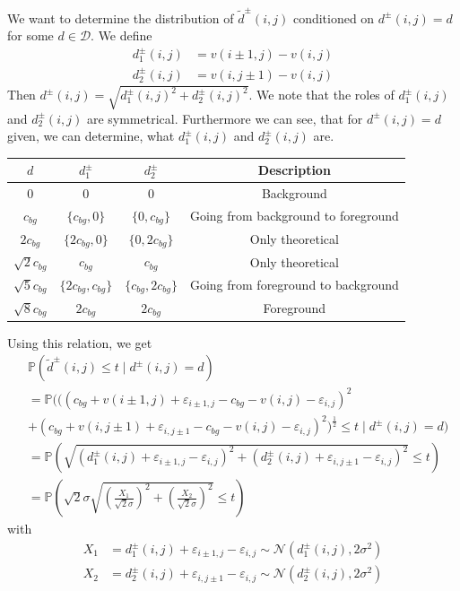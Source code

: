 \documentclass[a4paper,12pt]{article}
\theoremstyle{plain}
\theoremstyle{definition}
\theoremstyle{remark}
\begin{document}
	We want to determine the distribution of $\tilde{d}^\pm(i, j)$ conditioned on $d^\pm(i, j) = d$ for some $d \in \mathcal{D}$. We define
	\begin{align*}
		d_1^\pm(i, j) &= v(i \pm 1, j) - v(i, j) \\
		d_2^\pm(i, j) &= v(i, j \pm 1) - v(i, j)
	\end{align*}
	Then $d^\pm(i, j) = \sqrt{d_1^\pm(i, j)^2 + d_2^\pm(i, j)^2}$. We note that the roles of $d_1^\pm(i, j)$ and $d_2^\pm(i, j)$ are symmetrical. Furthermore we can see, that for $d^\pm(i, j) = d$ given, we can determine, what $d_1^\pm(i, j)$ and $d_2^\pm(i, j)$ are.
	
	\begin{center}
		\begin{tabular}{c|c|c|c}
			$d$ & $d_1^\pm$ & $d_2^\pm$ & Description \\
			\hline
			$0$ & $0$ & $0$ & Background \\
			\hline
			$c_{bg}$ & $\{ c_{bg}, 0 \}$ & $\{ 0, c_{bg} \}$ & Going from background to foreground \\
			\hline
			$2 c_{bg}$ & $\{ 2 c_{bg}, 0 \}$ & $\{ 0, 2 c_{bg} \}$ & Only theoretical \\
			\hline
			$\sqrt{2} c_{bg}$ & $c_{bg}$ & $c_{bg}$ & Only theoretical \\
			\hline
			$\sqrt{5} c_{bg}$ & $\{ 2 c_{bg}, c_{bg} \}$ & $\{ c_{bg}, 2 c_{bg} \}$ & Going from foreground to background \\
			\hline
			$\sqrt{8} c_{bg}$ & $2 c_{bg}$ & $2 c_{bg}$ & Foreground \\
		\end{tabular}
	\end{center}
	
	Using this relation, we get
	\begin{align*}
		&\mathbb{P}(\tilde{d}^\pm(i, j) \leq t \mid d^\pm(i, j) = d) \\
		&= \mathbb{P}(( (c_{bg} + v(i \pm 1, j) + \varepsilon_{i \pm 1, j} - c_{bg} - v(i, j) - \varepsilon_{i, j})^2 \\
		&+ (c_{bg} + v(i, j \pm 1) + \varepsilon_{i, j \pm 1} - c_{bg} - v(i, j) - \varepsilon_{i, j})^2 )^{\frac{1}{2}} \leq t \mid d^\pm(i, j) = d) \\
		&= \mathbb{P}\left( \sqrt{(d_1^\pm(i, j) + \varepsilon_{i \pm 1, j} - \varepsilon_{i, j})^2 + (d_2^\pm(i, j) + \varepsilon_{i, j \pm 1} - \varepsilon_{i, j})^2} \leq t \right) \\
		&= \mathbb{P}\left( \sqrt{2} \sigma \sqrt{\left( \frac{X_1}{\sqrt{2} \sigma} \right)^2 + \left( \frac{X_2}{\sqrt{2} \sigma} \right)^2} \leq t \right)
	\end{align*}
	with
	\begin{align*}
		X_1 &= d_1^\pm(i, j) + \varepsilon_{i \pm 1, j} - \varepsilon_{i, j} \sim \mathcal{N}(d_1^\pm(i, j), 2 \sigma^2) \\
		X_2 &= d_2^\pm(i, j) + \varepsilon_{i, j \pm 1} - \varepsilon_{i, j} \sim \mathcal{N}(d_2^\pm(i, j), 2 \sigma^2)
	\end{align*}
	
\end{document}
